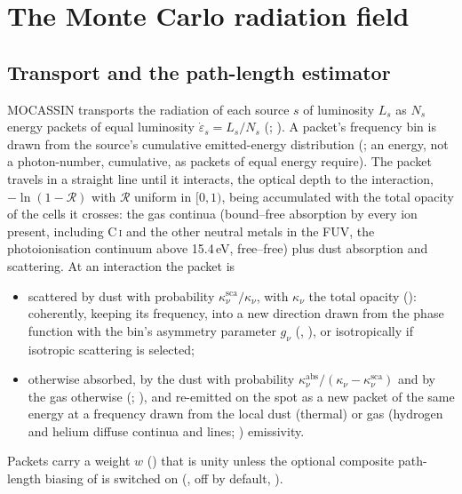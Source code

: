 \section{The Monte Carlo radiation field}
\label{sec:field}

\subsection{Transport and the path-length estimator}

MOCASSIN transports the radiation of each source $s$ of luminosity $L_s$ as
$N_s$ energy packets of equal luminosity $\dot\varepsilon_s=L_s/N_s$
(; \citealt{Ercolano2003}). A packet's frequency bin is drawn
from the source's cumulative emitted-energy distribution
(; an energy, not a photon-number, cumulative, as
packets of equal energy require). The packet travels in a straight line until
it interacts, the optical depth to the interaction, $-\ln(1-\mathcal R)$ with
$\mathcal R$ uniform in $[0,1)$, being accumulated with the total opacity of
the cells it crosses: the gas continua (bound--free absorption by every ion
present, including C\,\textsc{i} and the other neutral metals in the FUV, the
\Htwo{} photoionisation continuum above 15.4\,eV, free--free) plus dust
absorption and scattering. At an interaction the packet is
\begin{itemize}
\item scattered by dust with probability $\kappa^{\mathrm{sca}}_\nu/\kappa_\nu$, with $\kappa_\nu$ the
  total opacity (): coherently, keeping its
  frequency, into a new direction drawn from the \citet{HenyeyGreenstein1941}
  phase function with the bin's asymmetry parameter $g_\nu$ (,
  ), or isotropically if isotropic scattering is selected;
\item otherwise absorbed, by the dust with probability
  $\kappa^{\mathrm{abs}}_\nu/(\kappa_\nu-\kappa^{\mathrm{sca}}_\nu)$ and by the gas otherwise
  (; ), and re-emitted on the spot as a new
  packet of the same energy at a frequency drawn from the local dust (thermal)
  or gas (hydrogen and helium diffuse continua and lines; )
  emissivity.
\end{itemize}
Packets carry a weight $w$ () that is unity unless the
optional composite path-length biasing of \citet{Baes2016} is switched on
(, off by default, ).

